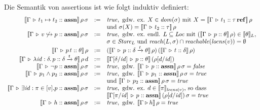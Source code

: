 \documentclass[12pt,a4paper,bigheadings]{scrartcl}
\newcommand{\semantic}[1]{\ensuremath{\llbracket#1\rrbracket}}
\newcommand{\assn}{\ensuremath{\mathbf{assn}}}
\newcommand{\locns}{\name{locns}}
\newcommand{\tto}{\ensuremath{\xrightarrow{t}}}
\renewcommand{\disjoint}[2]{\ensuremath{#2\not\hookrightarrow#1}}
\begin{document}
\pagebreak[3] \noindent
Die Semantik von assertions ist wie folgt induktiv definiert:
\[\begin{array}{rcl}
  \semantic{\Tj{\Gamma}{t_1\mapsto t_2}{\assn}}\,\rho\,\sigma
  & := &
  \true, \text{ gdw. ex. } X\in\dom{\sigma} \text{ mit } X = \semantic{\Tj{\Gamma}{t_1}{\reftype{\tau}}}\,\rho \\
  && \text{und } \sigma(X) = \semantic{\Tj{\Gamma}{t_2}{\tau}}\,\rho
  \\
  \semantic{\Tj{\Gamma}{\disjoint{p}{v}}{\assn}}\,\rho\,\sigma
  & := &
  \true, \text{ gdw. ex. endl. } L \subseteq \Loc \text{ mit }
         (\semantic{\Tj{\Gamma}{p}{\theta}}\,\rho) \in\semantic{\theta}_L, \\
      && \sigma\in\Store_L \text{ und } \name{reach}(L,\sigma) \cap \name{reachable}(\locns(v))=\emptyset
  \\
  \semantic{\Tj{\Gamma}{\app{p}{t}}{\theta}}\,\rho
  & := &
  (\semantic{\Tj{\Gamma}{p}{\delta \tto \theta}}\,\rho)\,(\semantic{\Tj{\Gamma}{t}{\delta}}\,\rho)
  \\
  \semantic{\Tj{\Gamma}{\abstr{\id:\delta}{p}}{\delta \tto \theta}}\,\rho\,d
  & := &
  \semantic{\Tj{\Gamma[\delta/\id]}{p}{\theta}}\,(\rho[d/\id])
  \\
  \semantic{\Tj{\Gamma}{\neg p}{\assn}}\,\rho\,\sigma
  & := &
  \true, \text{ gdw. } \semantic{\Tj{\Gamma}{p}{\assn}}\,\rho\,\sigma = \false
  \\
  \semantic{\Tj{\Gamma}{p_1 \wedge p_2}{\assn}}\,\rho\,\sigma
  & := &
  \true, \text{ gdw. } \semantic{\Tj{\Gamma}{p_1}{\assn}}\,\rho\,\sigma = \true \\
  && \text{und } \semantic{\Tj{\Gamma}{p_2}{\assn}}\,\rho\,\sigma = \true
  \\
  \semantic{\Tj{\Gamma}{\exists \id:\pi \in [v].p}{\assn}}\,\rho\,\sigma
  & := &
  \true, \text{ gdw. ex. $d\in\semantic{\pi}_{\locns(v)}$, so dass} \\
  && \semantic{\Tj{\Gamma[\pi/\id]}{p}{\assn}}\,(\rho[d/\id])\,\sigma = \true
  \\
  \semantic{\Tj{\Gamma}{h}{\assn}}\,\rho\,\sigma
  & := &
  \true, \text{ gdw. } \semantic{\Tjh{\Gamma}{h}}\,\rho = \true
\end{array}\]
\end{document}
